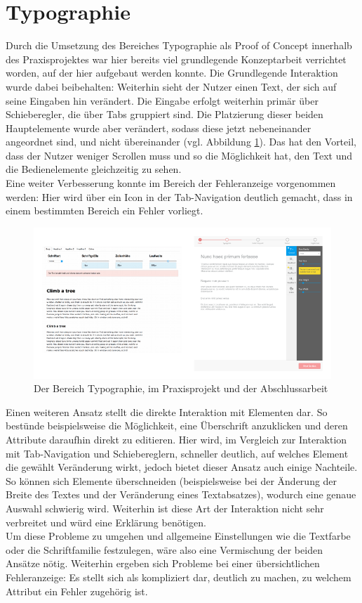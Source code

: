 \section{Typographie}
Durch die Umsetzung des Bereiches Typographie als Proof of Concept innerhalb des Praxisprojektes war hier bereits viel grundlegende Konzeptarbeit verrichtet worden, auf der hier aufgebaut werden konnte. Die Grundlegende Interaktion wurde dabei beibehalten: Weiterhin sieht der Nutzer einen Text, der sich auf seine Eingaben hin verändert. Die Eingabe erfolgt weiterhin primär über Schieberegler, die über Tabs gruppiert sind. Die Platzierung dieser beiden Hauptelemente wurde aber verändert, sodass diese jetzt nebeneinander angeordnet sind, und nicht übereinander (vgl. Abbildung \ref{fig:vgl_poc_ba}). Das hat den Vorteil, dass der Nutzer weniger Scrollen muss und so die Möglichkeit hat, den Text und die Bedienelemente gleichzeitig zu sehen.\\
Eine weiter Verbesserung konnte im Bereich der Fehleranzeige vorgenommen werden: Hier wird über ein Icon in der Tab-Navigation deutlich gemacht, dass in einem bestimmten Bereich ein Fehler vorliegt.

\begin{figure}[h]
    \centering
    \includegraphics[width=1\textwidth]{images/vergleich_PoC_BA.png}
    \caption{Der Bereich Typographie, im Praxisprojekt und der Abschlussarbeit}
    \label{fig:vgl_poc_ba}
\end{figure}

Einen weiteren Ansatz stellt die direkte Interaktion mit Elementen dar. So bestünde beispielsweise die Möglichkeit, eine Überschrift anzuklicken und deren Attribute daraufhin direkt zu editieren. Hier wird, im Vergleich zur Interaktion mit Tab-Navigation und Schiebereglern, schneller deutlich, auf welches Element die gewählt Veränderung wirkt, jedoch bietet dieser Ansatz auch einige Nachteile. So können sich Elemente überschneiden (beispielsweise bei der Änderung der Breite des Textes und der Veränderung eines Textabsatzes), wodurch eine genaue Auswahl schwierig wird. Weiterhin ist diese Art der Interaktion nicht sehr verbreitet und würd eine Erklärung benötigen.\\
Um diese Probleme zu umgehen und allgemeine Einstellungen wie die Textfarbe oder die Schriftfamilie festzulegen, wäre also eine Vermischung der beiden Ansätze nötig. Weiterhin ergeben sich Probleme bei einer übersichtlichen Fehleranzeige: Es stellt sich als kompliziert dar, deutlich zu machen, zu welchem Attribut ein Fehler zugehörig ist.\\

